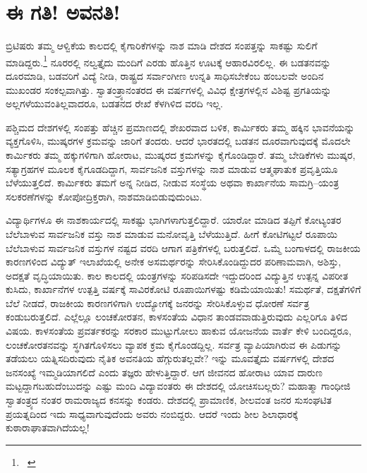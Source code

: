 \section*{ಈ ಗತಿ! ಅವನತಿ!}


ಬ್ರಿಟಿಷರು ತಮ್ಮ ಆಳ್ವಿಕೆಯ ಕಾಲದಲ್ಲಿ ಕೈಗಾರಿಕೆಗಳನ್ನು ನಾಶ ಮಾಡಿ ದೇಶದ ಸಂಪತ್ತನ್ನು ಸಾಕಷ್ಟು ಸುಲಿಗೆ ಮಾಡಿದ್ದರು.\footnote{

~\hfill{}} ನೂರರಲ್ಲಿ ನಲ್ವತ್ತೈದು ಮಂದಿಗೆ ಎರಡು ಹೊತ್ತಿನ ಊಟಕ್ಕೆ ಆಹಾರವಿರಲಿಲ್ಲ. ಈ ಬಡತನವನ್ನು ದೂರಮಾಡಿ, ಬಡವರಿಗೆ ವಿದ್ಯೆ ನೀಡಿ, ರಾಷ್ಟ್ರದ ಸರ್ವಾಂಗೀಣ ಉನ್ನತಿ ಸಾಧಿಸಬೇಕೆಂಬ ಹಂಬಲವೇ ಅಂದಿನ ಮುಖಂಡರ ಸಂಕಲ್ಪವಾಗಿತ್ತು. ಸ್ವಾತಂತ್ರ್ಯಾನಂತರದ ಈ ವರ್ಷಗಳಲ್ಲಿ ವಿವಿಧ ಕ್ಷೇತ್ರಗಳಲ್ಲಿನ ವಿಶಿಷ್ಟ ಪ್ರಗತಿಯನ್ನು ಅಲ್ಲಗಳೆಯುವಂತಿಲ್ಲವಾದರೂ, ಬಡತನದ ರೇಖೆ ಕೆಳಗಿಳಿದ ವರದಿ ಇಲ್ಲ.

ಪಶ್ಚಿಮದ ದೇಶಗಳಲ್ಲಿ ಸಂಪತ್ತು ಹೆಚ್ಚಿನ ಪ್ರಮಾಣದಲ್ಲಿ ಶೇಖರವಾದ ಬಳಿಕ, ಕಾರ್ಮಿಕರು ತಮ್ಮ ಹಕ್ಕಿನ ಭಾವನೆಯನ್ನು ವ್ಯಕ್ತಗೊಳಿಸಿ, ಮುಷ್ಕರಗಳ ಕ್ರಮವನ್ನು ಜಾರಿಗೆ ತಂದರು. ಆದರೆ ಭಾರತದಲ್ಲಿ ಬಡತನ ದೂರವಾಗುವುದಕ್ಕೆ ಮೊದಲೇ ಕಾರ್ಮಿಕರು ತಮ್ಮ ಹಕ್ಕುಗಳಿಗಾಗಿ ಹೋರಾಟ, ಮುಷ್ಕರದ ಕ್ರಮಗಳನ್ನು ಕೈಗೊಂಡಿದ್ದಾರೆ. ತಮ್ಮ ಬೇಡಿಕೆಗಳು ಮುಷ್ಕರ, ಸತ್ಯಾಗ್ರಹಗಳ ಮೂಲಕ ಕೈಗೂಡದಿದ್ದಾಗ, ಸಾರ್ವಜನಿಕ ವಸ್ತುಗಳನ್ನು ನಾಶ ಮಾಡುವ ಆತ್ಮಘಾತುಕ ಪ್ರವೃತ್ತಿಯೂ ಬೆಳೆ\-ಯುತ್ತ\-ಲಿದೆ. ಕಾರ್ಮಿಕರು ತಮಗೆ ಅನ್ನ ನೀಡಿದ, ನೀಡುವ ಸಂಸ್ಥೆಯ ಅಥವಾ ಕಾರ್ಖಾನೆಯ ಸಾಮಗ್ರಿ–ಯಂತ್ರ ಸಲಕರಣೆಗಳನ್ನು ಕೋಪೋದ್ರಿಕ್ತರಾಗಿ, ನಾಶಮಾಡಿಬಿಡುವುದುಂಟು.

ವಿದ್ಯಾರ್ಥಿಗಳೂ ಈ ನಾಶಕಾರ್ಯದಲ್ಲಿ ಸಾಕಷ್ಟು ಭಾಗಿಗಳಾಗುತ್ತಲಿದ್ದಾರೆ. ಯಾರೋ ಮಾಡಿದ ತಪ್ಪಿಗೆ ಕೋಟ್ಯಂತರ ಬೆಲೆಬಾಳುವ ಸಾರ್ವಜನಿಕ ವಸ್ತು ನಾಶ ಮಾಡುವ ಮನೋವೃತ್ತಿ ಬೆಳೆಯುತ್ತಿದೆ. ಹೀಗೆ ಕೋಟಿಗಟ್ಟಲೆ ರೂಪಾಯಿ ಬೆಲೆಬಾಳುವ ಸಾರ್ವಜನಿಕ ವಸ್ತುಗಳ ನಷ್ಟದ ವರದಿ ಆಗಾಗ ಪತ್ರಿಕೆಗಳಲ್ಲಿ ಬರುತ್ತಲಿದೆ. ಒಮ್ಮೆ ಬಂಗಾಳದಲ್ಲಿ ರಾಜಕೀಯ ಕಾರಣಗಳಿಂದ ವಿದ್ಯುತ್ ಇಲಾಖೆಯಲ್ಲಿ ಅನೇಕ ಅಸಮರ್ಥರನ್ನು ಸೇರಿಸಿಕೊಂಡಿದ್ದುದರ ಪರಿಣಾಮವಾಗಿ, ಅಶಿಸ್ತು, ಅದಕ್ಷತೆ ವೃದ್ಧಿಯಾಯಿತು. ಕಾಲ ಕಾಲದಲ್ಲಿ ಯಂತ್ರಗಳನ್ನು ಸರಿಪಡಿಸದೇ ಇದ್ದುದರಿಂದ ವಿದ್ಯುತ್ತಿನ ಉತ್ಪನ್ನ ವಿಪರೀತ ಕುಸಿದು, ಕಾರ್ಖಾನೆಗಳ ಉತ್ಪತ್ತಿ ವರ್ಷಕ್ಕೆ ಸಾವಿರಕೋಟಿ ರೂಪಾಯಿಗಳಷ್ಟು ಕಡಿಮೆಯಾಯಿತು! ಸಮರ್ಥತೆ, ದಕ್ಷತೆಗಳಿಗೆ ಬೆಲೆ ನೀಡದೆ, ರಾಜಕೀಯ ಕಾರಣಗಳಿಗಾಗಿ ಉದ್ಯೋಗಕ್ಕೆ ಜನರನ್ನು ಸೇರಿಸಿಕೊಳ್ಳುವ ಧೋರಣೆ ಸರ್ವತ್ರ ಕಂಡುಬರುತ್ತಲಿದೆ. ಎಲ್ಲೆಲ್ಲೂ ಲಂಚಕೋರತನ, ಕಾಳಸಂತೆಯ ವಿಧಾನ ತಾಂಡವವಾಡುತ್ತಿರುವುದು ಎಲ್ಲರಿಗೂ ತಿಳಿದ ವಿಷಯ. ಕಾಳಸಂತೆಯ ಪ್ರವರ್ತಕರನ್ನು ಸರಕಾರ ಮುಟ್ಟುಗೋಲು ಹಾಕುವ ಯೋಜನೆಯ ವಾರ್ತೆ ಕೇಳಿ ಬಂದಿದ್ದರೂ, ಲಂಚಕೋರತನವನ್ನು ಸ್ಥಗಿತಗೊಳಿಸಲು ವ್ಯಾಪಕ ಕ್ರಮ ಕೈಗೊಂಡದ್ದಿಲ್ಲ. ಸರ್ವತ್ರ ವ್ಯಾಪಿಯಾಗಿರುವ ಈ ಪಿಡುಗನ್ನು ತಡೆಯಲು ಯತ್ನಿಸದಿರುವುದು ನೈತಿಕ ಅವನತಿಯ ಹೆಗ್ಗುರುತಲ್ಲವೇ? ಇನ್ನು ಮೂವತ್ತೈದು ವರ್ಷಗಳಲ್ಲಿ ದೇಶದ ಜನಸಂಖ್ಯೆ ಇಮ್ಮಡಿಯಾಗಲಿದೆ ಎಂದು ತಜ್ಞರು ಹೇಳುತ್ತಿದ್ದಾರೆ. ಆಗ ಜೀವನದ ಹೋರಾಟ ಯಾವ ದಾರುಣ ಮಟ್ಟದ್ದಾಗಬಹು\-ದೆಂಬುದನ್ನು ಎಷ್ಟು ಮಂದಿ ವಿದ್ಯಾವಂತರು ಈ ದೇಶದಲ್ಲಿ ಯೋಚಿಸಬಲ್ಲರು? ಮಹಾತ್ಮಾ ಗಾಂಧೀಜಿ ಸ್ವಾತಂತ್ರ್ಯದ ನಂತರ ರಾಮರಾಜ್ಯದ ಕನಸನ್ನು ಕಂಡರು. ದೇಶದಲ್ಲಿ ಪ್ರಾಮಾಣಿಕ, ಶೀಲವಂತ ಜನರ ಸುಸಂಘಟಿತ ಪ್ರಯತ್ನದಿಂದ ಇದು ಸಾಧ್ಯವಾಗುವುದೆಂದು ಅವರು ನಂಬಿದ್ದರು. ಆದರೆ ಇಂದು ಶೀಲ ಶಿಲಾಧಾರಕ್ಕೆ ಕುಠಾರಾಘಾತವಾಗಿದೆಯಲ್ಲ!

